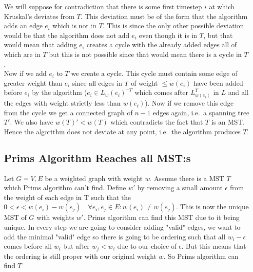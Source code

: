 \documentclass[nobib]{tufte-handout}
\begin{document}
            We will suppose for contradiction that there is some first timestep $i$ at which Kruskal's deviates from $T$. This deviation must be of the form that the algorithm adds an edge $e_i$ which is not in $T$. This is since the only other possible deviation would be that the algorithm does not add $e_i$ even though it is in $T$, but that would mean that adding $e_i$ creates a cycle with the already added edges all of which are in $T$ but this is not possible since that would mean there is a cycle in $T$. \\

            Now if we add $e_i$ to $T$ we create a cycle. This cycle must contain some edge of greater weight than $e_i$ since all edges in $T$ of weight $\leq w(e_i)$ have been added before $e_i$ by the algorithm ($e_i \in L_w(e_i)^{\neg T}$ which comes after $L_{w(e_i)}^T$ in $L$ and all the edges with weight strictly less than $w(e_i)$). Now if we remove this edge from the cycle we get a connected graph of $n - 1$ edges again, i.e.\ a spanning tree $T'$. We also have $w(T)' < w(T)$ which contradicts the fact that $T$ is an MST. Hence the algorithm does not deviate at any point, i.e.\ the algorithm produces $T$.

            
        
\subsection{Prims Algorithm Reaches all MST:s}

Let \(G={V,E} \) be a weighted graph with weight \( w \). Assume there is a MST \( T \) which Prims algorithm can't find. Define \( w' \) by removing a small amount \( \epsilon \) from the weight of each edge in T such that the \( 0<\epsilon<w(e_i)-w(e_j) \quad \forall e_i, e_j \in E: w(e_i)\neq w(e_j)\). This is now the unique MST of \(G \) with weights \( w' \). Prims algorithm can find this MST due to it being unique. In every step we are going to consider adding "valid" edges, we want to add the minimal "valid" edge so there is going to be ordering such that all \( w_i-\epsilon \) comes before all \( w_i\) but after \( w_j<w_i \) due to our choice of \( \epsilon \). But this means that the ordering is still proper with our original weight \( w \). So Prims algorithm can find \( T \quad \) %
\end{document}
